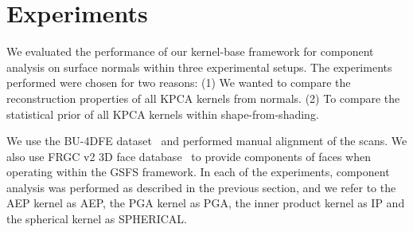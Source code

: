 \section{Experiments}\label{sec:experiments}
We evaluated the performance of our kernel-base framework for component analysis 
on surface normals within three experimental setups. The experiments performed 
were chosen for two reasons: (1) We wanted to compare the reconstruction 
properties of all KPCA kernels from normals. (2) To compare the statistical 
prior of all KPCA kernels within shape-from-shading. 

We use the BU-4DFE dataset~\cite{yin2008high} and performed manual alignment 
of the scans. We also use FRGC v2 3D face database~\cite{phillips2005overview} to 
provide components of faces when operating within the GSFS framework. In each 
of the experiments, component analysis was performed as described in the 
previous section, and we refer to the AEP kernel as AEP, the PGA kernel as 
PGA, the inner product kernel as IP and the spherical kernel as SPHERICAL\@.
